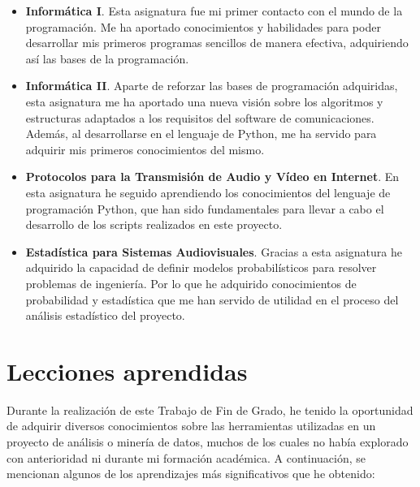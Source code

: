 \documentclass[a4paper, 12pt]{book}
\begin{document}
\begin{itemize}
  \item \textbf{Informática I}. Esta asignatura fue mi primer contacto con el mundo de la programación. Me ha aportado conocimientos y habilidades para poder desarrollar mis primeros
  programas sencillos de manera efectiva, adquiriendo así las bases de la programación. 
  \item \textbf{Informática II}. Aparte de reforzar las bases de programación adquiridas, esta asignatura me ha aportado una nueva visión sobre los algoritmos y estructuras adaptados
  a los requisitos del software de comunicaciones. Además, al desarrollarse en el lenguaje de Python, me ha servido para adquirir mis primeros conocimientos del mismo.
  \item \textbf{Protocolos para la Transmisión de Audio y Vídeo en Internet}. En esta asignatura he seguido aprendiendo los conocimientos del lenguaje de programación Python, que han sido
  fundamentales para llevar a cabo el desarrollo de los scripts realizados en este proyecto. 
  \item \textbf{Estadística para Sistemas Audiovisuales}. Gracias a esta asignatura he adquirido la capacidad de definir modelos probabilísticos para resolver problemas de ingeniería.
  Por lo que he adquirido conocimientos de probabilidad y estadística que me han servido de utilidad en el proceso del análisis estadístico del proyecto.
\end{itemize}

\section{Lecciones aprendidas}
\label{sec:lecciones_aprendidas}

Durante la realización de este Trabajo de Fin de Grado, he tenido la oportunidad de adquirir diversos conocimientos sobre las herramientas utilizadas en un proyecto de análisis o minería
de datos, muchos de los cuales no había explorado con anterioridad ni durante mi formación académica. A continuación, se mencionan algunos de los aprendizajes más significativos que he
obtenido:
\end{document}
